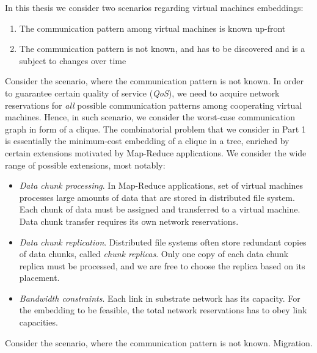 In this thesis we consider two scenarios regarding virtual machines embeddings:
\begin{enumerate}
  \item The communication pattern among virtual machines is known up-front
  \item The communication pattern is not known, and has to be discovered and is a subject to changes over time
\end{enumerate}


Consider the scenario, where the communication pattern is not known.
In order to guarantee certain quality of service (\emph{QoS}), we need to acquire network reservations for \emph{all} possible communication patterns among cooperating virtual machines.
Hence, in such scenario, we consider the worst-case communication graph in form of a clique.
The combinatorial problem that we consider in Part 1 is essentially the minimum-cost embedding of a clique in a tree, enriched by certain extensions motivated by Map-Reduce applications.
We consider the wide range of possible extensions, most notably:

\begin{itemize}
\item \emph{Data chunk processing}. In Map-Reduce applications, set of virtual machines processes large amounts of data that are stored in distributed file system. Each chunk of data must be assigned and transferred to a virtual machine. Data chunk transfer requires its own network reservations.

\item \emph{Data chunk replication}. Distributed file systems often store redundant copies of data chunks, called \emph{chunk replicas}. Only one copy of each data chunk replica must be processed, and we are free to choose the replica based on its placement.

\item \emph{Bandwidth constraints}. Each link in substrate network has its capacity. For the embedding to be feasible, the total network reservations has to obey link capacities.
\end{itemize}

Consider the scenario, where the communication pattern is not known.
Migration.



